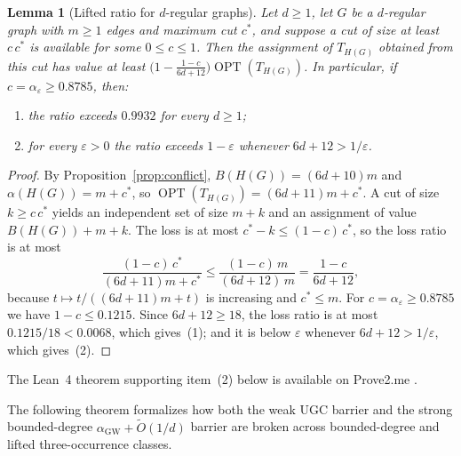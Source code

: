 \documentclass[pdflatex,sn-mathphys-num]{sn-jnl}%
\theoremstyle{thmstyleone}%
\newtheorem{Lemma}[Theorem]{Lemma}
\theoremstyle{thmstyletwo}%
\theoremstyle{thmstylethree}%
\begin{document}
\begin{Lemma}[Lifted ratio for $d$-regular graphs]\label{lem:strong-lift}
Let $d \ge 1$, let $G$ be a $d$-regular graph with $m \ge 1$ edges and maximum cut $c^\ast$, and suppose a cut of size at least $c\,c^\ast$ is available for some $0 \le c \le 1$. Then the assignment of $T_{H(G)}$ obtained from this cut has value at least $\bigl(1 - \frac{1-c}{6d+12}\bigr)\operatorname{OPT}(T_{H(G)})$. In particular, if $c = \alpha_\varepsilon \ge 0.8785$, then:
\begin{enumerate}
\item the ratio exceeds $0.9932$ for every $d \ge 1$;
\item for every $\varepsilon > 0$ the ratio exceeds $1 - \varepsilon$ whenever $6d+12 > 1/\varepsilon$.
\end{enumerate}
\end{Lemma}

\begin{proof}
By Proposition~\ref{prop:conflict}, $B(H(G)) = (6d+10)m$ and $\alpha(H(G)) = m + c^\ast$, so $\operatorname{OPT}(T_{H(G)}) = (6d+11)m + c^\ast$. A cut of size $k \ge c\,c^\ast$ yields an independent set of size $m+k$ and an assignment of value $B(H(G)) + m + k$. The loss is at most $c^\ast - k \le (1-c)\,c^\ast$, so the loss ratio is at most
\[
\frac{(1-c)\,c^\ast}{(6d+11)m + c^\ast} \le \frac{(1-c)\,m}{(6d+12)\,m} = \frac{1-c}{6d+12},
\]
because $t \mapsto t/((6d+11)m + t)$ is increasing and $c^\ast \le m$. For $c = \alpha_\varepsilon \ge 0.8785$ we have $1-c \le 0.1215$. Since $6d+12 \ge 18$, the loss ratio is at most $0.1215/18 < 0.0068$, which gives~(1); and it is below $\varepsilon$ whenever $6d+12 > 1/\varepsilon$, which gives~(2).
\end{proof}

The Lean~4 theorem supporting item~(2) below is available on Prove2.me \cite{VegaProve2MeStrongUgcBroken2026}.

The following theorem formalizes how both the weak UGC barrier and the strong bounded-degree $\alpha_{\mathrm{GW}} + \widetilde{O}(1/d)$ barrier are broken across bounded-degree and lifted three-occurrence classes.
\end{document}
